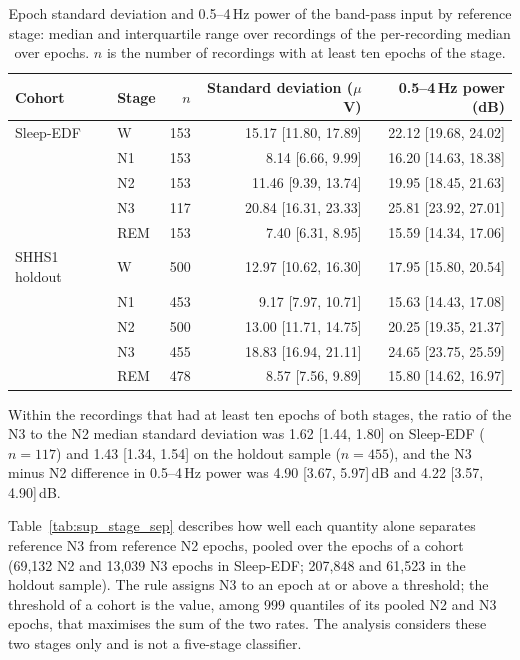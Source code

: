 \documentclass[10pt,a4paper]{article}
\begin{document}
\begin{table}[H]
\centering\small
\caption{Epoch standard deviation and 0.5--4\,Hz power of the band-pass input by reference stage: median
and interquartile range over recordings of the per-recording median over epochs. $n$ is the number of
recordings with at least ten epochs of the stage.}
\label{tab:sup_stage}
\begin{tabular}{llrrr}
\toprule
Cohort & Stage & $n$ & Standard deviation ($\mu$V) & 0.5--4\,Hz power (dB) \\
\midrule
Sleep-EDF & W & 153 & 15.17 [11.80, 17.89] & 22.12 [19.68, 24.02] \\
 & N1 & 153 & 8.14 [6.66, 9.99] & 16.20 [14.63, 18.38] \\
 & N2 & 153 & 11.46 [9.39, 13.74] & 19.95 [18.45, 21.63] \\
 & N3 & 117 & 20.84 [16.31, 23.33] & 25.81 [23.92, 27.01] \\
 & REM & 153 & 7.40 [6.31, 8.95] & 15.59 [14.34, 17.06] \\
\addlinespace
SHHS1 holdout & W & 500 & 12.97 [10.62, 16.30] & 17.95 [15.80, 20.54] \\
 & N1 & 453 & 9.17 [7.97, 10.71] & 15.63 [14.43, 17.08] \\
 & N2 & 500 & 13.00 [11.71, 14.75] & 20.25 [19.35, 21.37] \\
 & N3 & 455 & 18.83 [16.94, 21.11] & 24.65 [23.75, 25.59] \\
 & REM & 478 & 8.57 [7.56, 9.89] & 15.80 [14.62, 16.97] \\
\bottomrule
\end{tabular}
\end{table}

Within the recordings that had at least ten epochs of both stages, the ratio of the N3 to the N2 median
standard deviation was 1.62 [1.44, 1.80] on Sleep-EDF ($n=117$) and 1.43 [1.34, 1.54] on the holdout
sample ($n=455$), and the N3 minus N2 difference in 0.5--4\,Hz power was 4.90 [3.67, 5.97]\,dB and 4.22
[3.57, 4.90]\,dB.

Table~\ref{tab:sup_stage_sep} describes how well each quantity alone separates reference N3 from
reference N2 epochs, pooled over the epochs of a cohort (69{,}132 N2 and 13{,}039 N3 epochs in Sleep-EDF;
207{,}848 and 61{,}523 in the holdout sample). The rule assigns N3 to an epoch at or above a threshold;
the threshold of a cohort is the value, among 999 quantiles of its pooled N2 and N3 epochs, that maximises
the sum of the two rates. The analysis considers these two stages only and is not a five-stage classifier.
\end{document}
